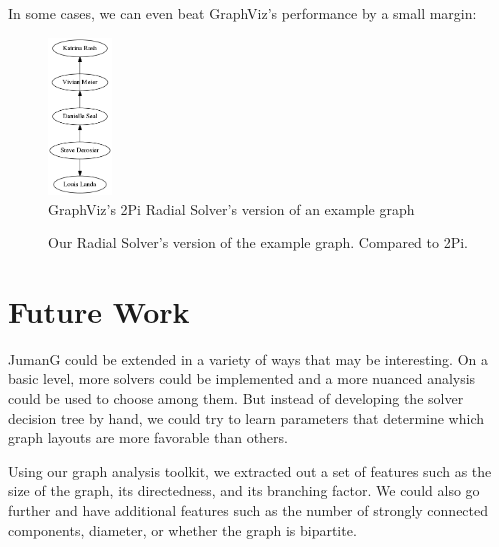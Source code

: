 \documentclass{article}
\begin{document}
In some cases, we can even beat GraphViz's performance by a small margin:

\begin{figure}[h!]
\caption{GraphViz's 2Pi Radial Solver's version of an example graph}
\centering
\includegraphics[width=0.15\textwidth]{turnip_dag.png}
\end{figure}

\begin{figure}
\caption{Our Radial Solver's version of the example graph. Compared to 2Pi.}
\end{figure}




\section{Future Work}
JumanG could be extended in a variety of ways that may be interesting. 
On a basic level, more solvers could be implemented and a more nuanced analysis could be used to choose among them. But instead of developing the solver decision tree by hand, we could try to learn parameters that determine which graph layouts are more favorable than others. 

Using our graph analysis toolkit, we extracted out a set of features such as the size of the graph, its directedness, and its branching factor. We could also go further and have additional features such as the number of strongly connected components, diameter, or whether the graph is bipartite.
\end{document}
